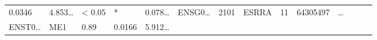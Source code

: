 \documentclass[
]{article}
\begin{document}
\begin{longtable}[]{@{}llllllllllllll@{}}
\begin{minipage}[t]{0.04\columnwidth}
0.0346\strut
\end{minipage} & \begin{minipage}[t]{0.05\columnwidth}\raggedright
4.853\ldots{}\strut
\end{minipage} & \begin{minipage}[t]{0.05\columnwidth}\raggedright
\textless{} 0.05\strut
\end{minipage} & \begin{minipage}[t]{0.03\columnwidth}\raggedright
*\strut
\end{minipage} & \begin{minipage}[t]{0.05\columnwidth}\raggedright
0.078\ldots{}\strut
\end{minipage} & \begin{minipage}[t]{0.05\columnwidth}\raggedright
ENSG0\ldots{}\strut
\end{minipage} & \begin{minipage}[t]{0.05\columnwidth}\raggedright
2101\strut
\end{minipage} & \begin{minipage}[t]{0.05\columnwidth}\raggedright
ESRRA\strut
\end{minipage} & \begin{minipage}[t]{0.05\columnwidth}\raggedright
11\strut
\end{minipage} & \begin{minipage}[t]{0.05\columnwidth}\raggedright
64305497\strut
\end{minipage} & \begin{minipage}[t]{0.02\columnwidth}\raggedright
\ldots{}\strut
\end{minipage}\tabularnewline
\begin{minipage}[t]{0.05\columnwidth}\raggedright
ENST0\ldots{}\strut
\end{minipage} & \begin{minipage}[t]{0.04\columnwidth}\raggedright
ME1\strut
\end{minipage} & \begin{minipage}[t]{0.04\columnwidth}\raggedright
0.89\strut
\end{minipage} & \begin{minipage}[t]{0.04\columnwidth}\raggedright
0.0166\strut
\end{minipage} & \begin{minipage}[t]{0.05\columnwidth}\raggedright
5.912\ldots{}\strut
\end{minipage} & \begin{minipage}[t]{0.05\columnwidth}\raggedright

\end{minipage}
\end{longtable}
\end{document}
